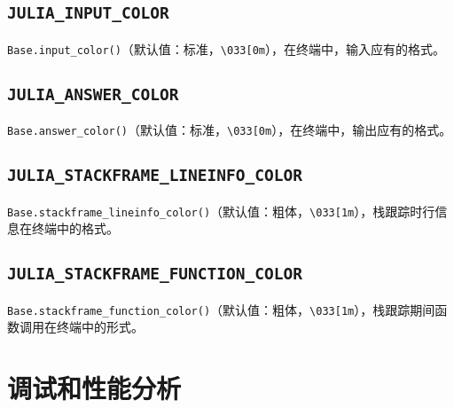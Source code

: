 \hypertarget{7277467062996316804}{}


\subsection{\texttt{JULIA\_INPUT\_COLOR}}



\texttt{Base.input\_color()}（默认值：标准，\texttt{{\textquotedbl}{\textbackslash}033[0m{\textquotedbl}}），在终端中，输入应有的格式。



\hypertarget{11974933399373427924}{}


\subsection{\texttt{JULIA\_ANSWER\_COLOR}}



\texttt{Base.answer\_color()}（默认值：标准，\texttt{{\textquotedbl}{\textbackslash}033[0m{\textquotedbl}}），在终端中，输出应有的格式。



\hypertarget{1071250415559095053}{}


\subsection{\texttt{JULIA\_STACKFRAME\_LINEINFO\_COLOR}}



\texttt{Base.stackframe\_lineinfo\_color()}（默认值：粗体，\texttt{{\textquotedbl}{\textbackslash}033[1m{\textquotedbl}}），栈跟踪时行信息在终端中的格式。



\hypertarget{15357004504591912181}{}


\subsection{\texttt{JULIA\_STACKFRAME\_FUNCTION\_COLOR}}



\texttt{Base.stackframe\_function\_color()}（默认值：粗体，\texttt{{\textquotedbl}{\textbackslash}033[1m{\textquotedbl}}），栈跟踪期间函数调用在终端中的形式。



\hypertarget{14262570954781492291}{}


\section{调试和性能分析}



